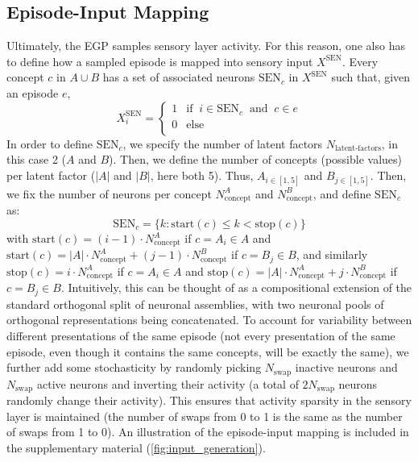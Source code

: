 \documentclass{article}
\begin{document}
\subsection*{Episode-Input Mapping}
Ultimately, the EGP samples sensory layer activity. For this reason, one also has to define how a sampled episode is mapped into sensory input $X^\textrm{SEN}$. Every concept $c$ in $A\cup B$ has a set of associated neurons $\textrm{SEN}_{c}$ in $X^\textrm{SEN}$ such that, given an episode $e$,
\begin{equation}
     X^\textrm{SEN}_{i} = \begin{cases} 
      1 & \textrm{if} \;\; i \in \textrm{SEN}_{c} \;\;\textrm{and}\;\; c \in e\\ 
      0 & \textrm{else} \\
   \end{cases}
\end{equation}
In order to define $\textrm{SEN}_c$, we specify the number of latent factors $N_\textrm{latent-factors}$, in this case 2 ($A$ and $B$). Then, we define the number of concepts (possible values) per latent factor ($|A|$ and $|B|$, here both 5). Thus, $A_{i \in [1, 5]}$ and $B_{j \in [1, 5]}$. Then, we fix the number of neurons per concept $N_\textrm{concept}^A$ and $N_\textrm{concept}^B$, and define $\textrm{SEN}_{c}$ as:
\begin{equation}
    \textrm{SEN}_{c} = \{k : \textrm{start}(c) \leq k < \textrm{stop}(c)\}
\end{equation}
with $\textrm{start}(c) = (i - 1) \cdot N_\textrm{concept}^A$ if $c = A_i \in A$ and $\textrm{start}(c) =|A|\cdot N_\textrm{concept}^A + (j - 1) \cdot N_\textrm{concept}^B$ if $c = B_j \in B$, and similarly $\textrm{stop}(c) = i \cdot N_\textrm{concept}^A$ if $c = A_i \in A$ and $\textrm{stop}(c) =|A|\cdot N_\textrm{concept}^A + j \cdot N_\textrm{concept}^B$ if $c = B_j \in B$. Intuitively, this can be thought of as a compositional extension of the standard orthogonal split of neuronal assemblies, with two neuronal pools of orthogonal representations being concatenated.
\newline\newline
To account for variability between different presentations of the same episode (not every presentation of the same episode, even though it contains the same concepts, will be exactly the same), we further add some stochasticity by randomly picking $N_\textrm{swap}$ inactive neurons and $N_\textrm{swap}$ active neurons and inverting their activity (a total of $2N_\textrm{swap}$ neurons randomly change their activity). This ensures that activity sparsity in the sensory layer is maintained (the number of swaps from 0 to 1 is the same as the number of swaps from 1 to 0). An illustration of the episode-input mapping is included in the supplementary material (\ref{fig:input_generation}).
\end{document}
